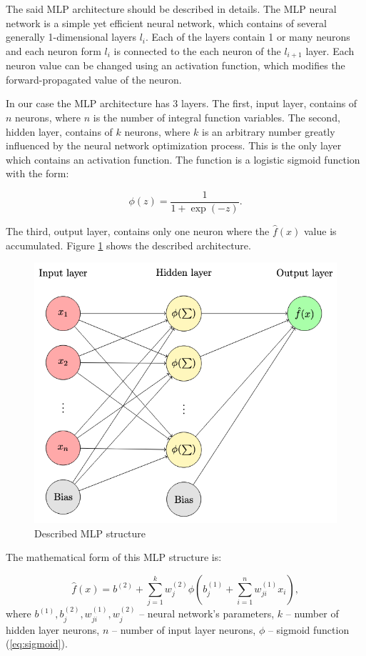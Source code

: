 \documentclass[%
]{ittmm}
\begin{document}
The said MLP architecture should be described in details. The MLP neural network is a simple yet efficient neural network, which contains of several generally 1-dimensional layers $l_i$. Each of the layers contain 1 or many neurons and each neuron form $l_i$ is connected to the each neuron of the $l_{i+1}$ layer. Each neuron value can be changed using an activation function, which modifies the forward-propagated value of the neuron. 

In our case the MLP architecture has 3 layers. The first, input layer, contains of $n$ neurons, where $n$ is the number of integral function variables. The second, hidden layer, contains of $k$ neurons, where $k$ is an arbitrary number greatly influenced by the neural network optimization process. This is the only layer which contains an activation function. The function is a logistic sigmoid function with the form:

\begin{equation}
\label{eq:sigmoid}
    \phi(z) = \frac{1}{1+\exp(-z)}.
\end{equation}

\noindent The third, output layer, contains only one neuron where the $\hat{f}(x)$ value is accumulated. Figure \ref{fig:structure} shows the described architecture.

\begin{figure}
    \centering
    \includegraphics[width=0.6\linewidth]{structure.png}
    \caption{Described MLP structure}
    \label{fig:structure}
\end{figure}

The mathematical form of this MLP structure is:

\begin{equation}
    \label{eq:math-form-mlp}
    \hat{f}(x) = b^{(2)} + \sum_{j=1}^{k}w_j^{(2)}\phi(b_j^{(1)}+\sum_{i=1}^{n}w_{ji}^{(1)}x_{i}),
\end{equation}
where $b^{(1)}, b_j^{(2)}, w_{ji}^{(1)}, w_j^{(2)}$ -- neural network's parameters, $k$ -- number of hidden layer neurons, $n$ -- number of input layer neurons, $\phi$ -- sigmoid function (\ref{eq:sigmoid}).
\end{document}

